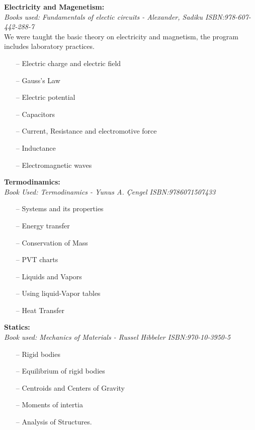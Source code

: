 \documentclass{article}
\begin{document}
\textbf{Electricity and Magenetism:}\\
    \emph{Books used: Fundamentals of electic circuits - Alexander, Sadiku ISBN:978-607-442-288-7}\\
  We were taught the basic theory on electricity and magnetism, the program includes laboratory
  practices.
  \begin{itemize}
     \setlength\itemsep{0pt}
    \item[--] Electric charge and electric field
    \item[--] Gauss's Law
    \item[--] Electric potential
    \item[--] Capacitors
    \item[--] Current, Resistance and electromotive force
    \item[--] Inductance
    \item[--] Electromagnetic waves
  \end{itemize}


\textbf{Termodinamics:}\\
    \emph{Book Used: Termodinamics - Yunus A. \c{C}engel    ISBN:9786071507433}
    \begin{itemize}
     \setlength\itemsep{0pt}
        \item[--] Systems and its properties
        \item[--] Energy transfer
        \item[--] Conservation of Mass
        \item[--] PVT charts
        \item[--] Liquids and Vapors
        \item[--] Using liquid-Vapor tables
        \item[--] Heat Transfer
    \end{itemize}
\newpage

\textbf{Statics:}\\
    \emph{Book used: Mechanics of Materials - Russel Hibbeler ISBN:970-10-3950-5}
    \begin{itemize}
     \setlength\itemsep{0pt}
    \item[--] Rigid bodies
    \item[--] Equilibrium of rigid bodies
    \item[--] Centroids and Centers of Gravity
    \item[--] Moments of intertia
    \item[--] Analysis of Structures.
    \end{itemize}
 
\end{document}
